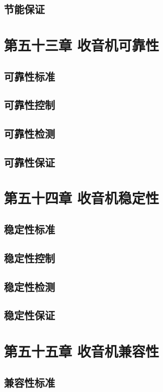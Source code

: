 \documentclass[12pt,UTF8]{ctexbook}
\begin{document}
\section{节能保证}

\chapter{第五十三章 收音机可靠性}

\section{可靠性标准}
\section{可靠性控制}
\section{可靠性检测}
\section{可靠性保证}

\chapter{第五十四章 收音机稳定性}

\section{稳定性标准}
\section{稳定性控制}
\section{稳定性检测}
\section{稳定性保证}

\chapter{第五十五章 收音机兼容性}

\section{兼容性标准}
\end{document}
